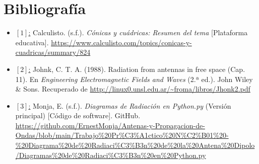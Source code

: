 \documentclass[12pt,a4paper]{article}
\begin{document}
\section{Bibliografía}
\begin{itemize}
    \raggedright
    \item \underline{$[1]$:} Calculisto. (s.f.). \textit{Cónicas y cuádricas: Resumen del tema} [Plataforma educativa]. \url{https://www.calculisto.com/topics/conicas-y-cuadricas/summary/824}

    \item \underline{$[2]$:} Johnk, C. T. A. (1988). Radiation from antennas in free space (Cap. 11). En \textit{Engineering Electromagnetic Fields and Waves} (2.ª ed.). John Wiley \& Sons. Recuperado de \url{http://linux0.unsl.edu.ar/~froma/libros/Jhonk2.pdf}

    \item \underline{$[3]$:} Monja, E. (s.f.). \textit{Diagramas de Radiación en Python.py} (Versión principal) [Código de software]. GitHub. \url{https://github.com/ErnestMonja/Antenas-y-Propagacion-de-Ondas/blob/main/Trabajo%20Pr%C3%A1ctico%20N%C2%B01%20-%20Diagrama%20de%20Radiaci%C3%B3n%20de%20la%20Antena%20Dipolo/Diagramas%20de%20Radiaci%C3%B3n%20en%20Python.py}
\end{itemize}
\end{document}
